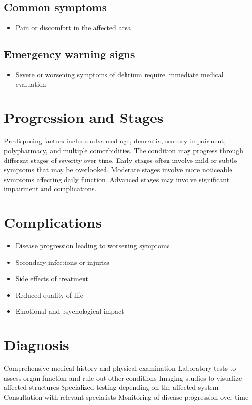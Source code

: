\subsection{Common symptoms}
\begin{itemize}[noitemsep]
  \item Pain or discomfort in the affected area
  \end{itemize}

\subsection{Emergency warning signs}
\begin{itemize}[noitemsep]
  \item Severe or worsening symptoms of delirium require immediate medical evaluation
\end{itemize}
\section{Progression and Stages}
Predisposing factors include advanced age, dementia, sensory impairment, polypharmacy, and multiple comorbidities. The condition may progress through different stages of severity over time. Early stages often involve mild or subtle symptoms that may be overlooked. Moderate stages involve more noticeable symptoms affecting daily function. Advanced stages may involve significant impairment and complications.
\section{Complications}
\begin{itemize}[noitemsep]
  \item Disease progression leading to worsening symptoms
  \item Secondary infections or injuries
  \item Side effects of treatment
  \item Reduced quality of life
  \item Emotional and psychological impact
\end{itemize}
\section{Diagnosis}
Comprehensive medical history and physical examination Laboratory tests to assess organ function and rule out other conditions Imaging studies to visualize affected structures Specialized testing depending on the affected system Consultation with relevant specialists Monitoring of disease progression over time

